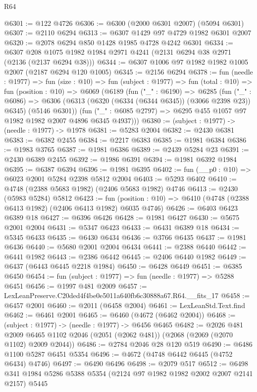 \begin{lexlean}{R64}
\begin{coremodule}
@6301 := @122 @4726
@6306 := @6300 (@2000 @6301 @2007) (@5094 @6301)
@6307 := @2110 @6294
@6313 := @6307 @1429 @97 @4729 @1982 @6301 @2007
@6320 := @2078 @6294 @850 @1428 @1985 @4728 @4242 @6301
@6334 := @6307 @208 @1075 @1982 @1984 @2971 @4241 (@2131 @6294 @38 @2971 (@2136 (@2137 @6294 @38)))
@6344 := @6307 @1006 @97 @1982 @1982 @1005 @2007 (@2187 @6294 @120 @1005)
@6345 := @2156 @6294
@6378 := fun (needle : @1977) =>
  fun (size : @10) =>
  fun (subject : @1977) =>
  fun (total : @10) =>
  fun (position : @10) =>
  @6069
    (@6189
      (fun ("_" : @6190) =>
      @6285
        (fun ("_" : @6086) =>
        @6306 (@6313 (@6320 (@6334 (@6344 @6345)) (@3066 @2398 @23)) @6345) (@5146 @6301))
        (fun ("_" : @6085 @2797) => @6295 @455 @1057 @97 @1982 @1982 @2007 @4896 @6345 @4937)))
@6380 := (subject : @1977) -> (needle : @1977) -> @1978
@6381 := @5283 @2004
@6382 := @2430 @6381
@6383 := @6382 @2455
@6384 := @2217 @6383
@6385 := @1981 @6384
@6386 := @1983 @3765
@6387 := @1981 @6386
@6389 := @2439 @5284 @23
@6391 := @2430 @6389 @2455
@6392 := @1986 @6391
@6394 := @1981 @6392 @1984
@6395 := @6387 @6394
@6396 := @1981 @6395
@6402 := fun (__p0 : @10) => @6023 @2001 @5284 @2398 @5812 @2004
@6403 := @5293 @6402
@6410 := @4748 (@2388 @5683 @1982) (@2406 @5683 @1982) @4746
@6413 := @2430 (@5983 @5284) @5812
@6423 := fun (position : @10) => @6410 (@4748 (@2388 @6413 @1982) (@2406 @6413 @1982) @6035 @4746)
@6426 := @6403 @6423 @6389 @18
@6427 := @6396 @6426
@6428 := @1981 @6427
@6430 := @5675 @2001 @2004
@6431 := @5347 @6423
@6433 := @6431 @6389 @18
@6434 := @5345 @6433
@6435 := @6430 @6434
@6436 := @3766 @6435
@6437 := @1981 @6436
@6440 := @5680 @2001 @2004 @6434
@6441 := @2388 @6440
@6442 := @6441 @1982
@6443 := @2386 @6442
@6445 := @2406 @6440 @1982
@6449 := @6437 (@6443 @6445 @2218 @1984)
@6450 := @6428 @6449
@6451 := @6385 @6450
@6454 := fun (subject : @1977) => fun (needle : @1977) => @5288 @6451
@6456 := @1997 @481 @2009
@6457 := LexLeanPreserve.C20ded4f4be0e5011a640fb6c30888a67.R64.__fits_17
@6458 := @6457 @2001
@6460 := @2011 (@6458 @2004)
@6461 := LexLeanStd.Text.find
@6462 := @6461 @2001
@6465 := @6460 (@4672 (@6462 @2004))
@6468 := (subject : @1977) -> (needle : @1977) -> @6456 @6465
@6482 := @2026
    @481
    @2009
    @6465
    @1102
    @2046
    (@2051 (@2062 @481))
    (@2068 (@2069 (@2070 @1102) @2009 @2044))
@6486 := @2784 @2046 @28 @120 @519
@6490 := @6486 @1100 @5287 @6451 @5354
@6496 := @4672 (@4748 @6442 @6445 (@4752 @6434) @4746)
@6497 := @6490 @6496
@6498 := @2079 @517
@6512 := @6498 @341 @1984 @5286 @5388 @5354 (@2124 @97 @1982 @1982 @2002 @2007 @2141 @2157) @5445

\end{coremodule}
\end{lexlean}
